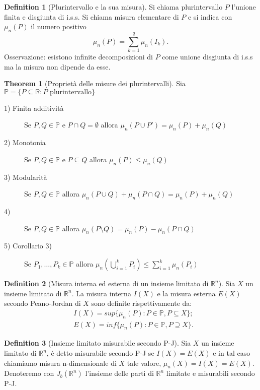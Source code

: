 \documentclass[leqno]{article}
\theoremstyle{definition}
\newtheorem{definition}{Definition}[section]
\numberwithin{equation}{section}
\newtheorem{theorem}{Theorem}[section]
\theoremstyle{remark}
\begin{document}
	\begin{definition}[Plurintervallo e la sua misura]
		Si chiama plurintervallo $P$ l'unione finita e disgiunta di i.s.s. Si chiama misura elementare di $P$ e si indica con $\mu_n(P)$ il numero positivo 
		\[\mu_n(P)=\sum_{k=1}^q\mu_n(I_k).\]
		Osservazione: esistono infinite decomposizioni di $P$ come unione disgiunta di i.s.s ma la misura non dipende da esse.
	\end{definition}
	\begin{theorem}[Proprietà delle misure dei plurintervalli]
		Sia $\mathbb{P}=\{P\subseteq \mathbb{R} : P \text{ plurintervallo}\}$
		\newline 
		\begin{description}
			\item [1) Finita additività] Se $P,Q\in \mathbb{P}$ e $P\cap Q=\emptyset $ allora $\mu_n(P\cup P')=\mu_n(P)+\mu_n(Q)$
			\item [2) Monotonia] Se $P,Q\in \mathbb{P}$ e $P\subseteq Q$ allora $\mu_n(P)\le\mu_n(Q)$
			\item[3) Modularità] Se $P,Q\in \mathbb{P}$ allora $\mu_n(P\cup Q)+\mu_n(P\cap Q)=\mu_n(P)+\mu_n(Q)$
			\item [4)] Se $P,Q\in \mathbb{P}$ allora $\mu_n(P\setminus Q)=\mu_n(P)-\mu_n(P\cap Q)$
			\item [5) Corollario 3) ] Se $P_1,\dots, P_k \in \mathbb{P}$ allora $\mu_n \left(\bigcup_{i=1}^k P_i\right)\le \sum_{i=1}^k \mu_n(P_i) $
		\end{description}
	\end{theorem}
	
	\begin{definition}[Misura interna ed esterna di un insieme limitato di $\mathbb{R}^n$]
		Sia $X$ un insieme limitato di $\mathbb{R}^n$. La misura interna $I(X)$ e la misura esterna $E(X)$ secondo Peano-Jordan di $X$ sono definite rispettivamente da:
		\begin{align*}
			&I(X)=sup\{\mu_n(P): P \in \mathbb{P}, P \subseteq X\}; \\ 
			&E(X)=inf\{\mu_n(P) : P \in \mathbb{P}, P \supseteq X\}. 
		\end{align*}
		
	\end{definition}
	\begin{definition}[Insieme limitato misurabile secondo P-J]
		Sia $X$ un insieme limitato di $\mathbb{R}^n$, è detto misurabile secondo P-J se $I(X)=E(X)$ e in tal caso chiamiamo misura n-dimensionale di $X$ tale valore, $\mu_n(X)=I(X)=E(X)$. Denoteremo con $J_b(\mathbb{R}^n)$ l'insieme delle parti di $\mathbb{R}^n$ limitate e misurabili secondo P-J.
	\end{definition}
	
\end{document}
